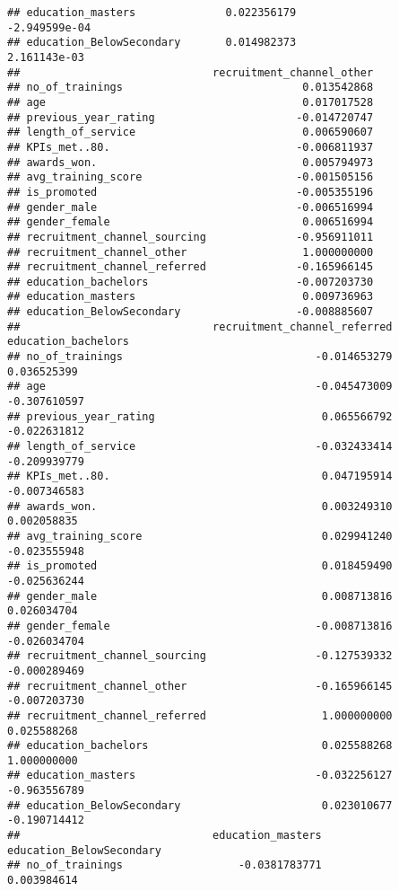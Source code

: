 \documentclass[
]{article}
\begin{document}
\begin{verbatim}
## education_masters              0.022356179                -2.949599e-04
## education_BelowSecondary       0.014982373                 2.161143e-03
##                              recruitment_channel_other
## no_of_trainings                            0.013542868
## age                                        0.017017528
## previous_year_rating                      -0.014720747
## length_of_service                          0.006590607
## KPIs_met..80.                             -0.006811937
## awards_won.                                0.005794973
## avg_training_score                        -0.001505156
## is_promoted                               -0.005355196
## gender_male                               -0.006516994
## gender_female                              0.006516994
## recruitment_channel_sourcing              -0.956911011
## recruitment_channel_other                  1.000000000
## recruitment_channel_referred              -0.165966145
## education_bachelors                       -0.007203730
## education_masters                          0.009736963
## education_BelowSecondary                  -0.008885607
##                              recruitment_channel_referred education_bachelors
## no_of_trainings                              -0.014653279         0.036525399
## age                                          -0.045473009        -0.307610597
## previous_year_rating                          0.065566792        -0.022631812
## length_of_service                            -0.032433414        -0.209939779
## KPIs_met..80.                                 0.047195914        -0.007346583
## awards_won.                                   0.003249310         0.002058835
## avg_training_score                            0.029941240        -0.023555948
## is_promoted                                   0.018459490        -0.025636244
## gender_male                                   0.008713816         0.026034704
## gender_female                                -0.008713816        -0.026034704
## recruitment_channel_sourcing                 -0.127539332        -0.000289469
## recruitment_channel_other                    -0.165966145        -0.007203730
## recruitment_channel_referred                  1.000000000         0.025588268
## education_bachelors                           0.025588268         1.000000000
## education_masters                            -0.032256127        -0.963556789
## education_BelowSecondary                      0.023010677        -0.190714412
##                              education_masters education_BelowSecondary
## no_of_trainings                  -0.0381783771              0.003984614

\end{verbatim}
\end{document}
